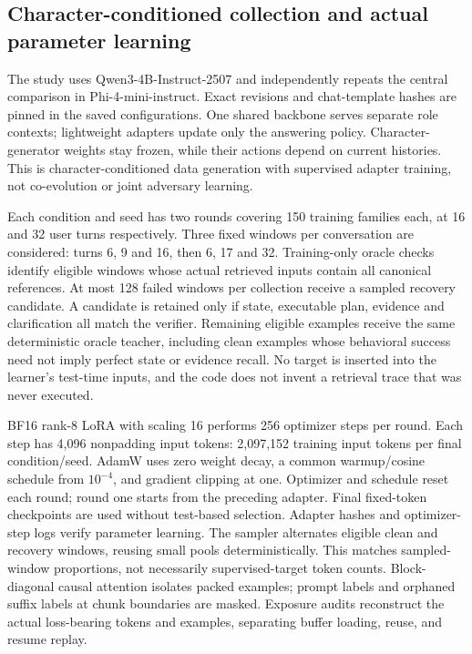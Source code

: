 \documentclass{svproc}
\begin{document}
\subsection{Character-conditioned collection and actual parameter learning}
The study uses Qwen3-4B-Instruct-2507 and independently repeats the central
comparison in Phi-4-mini-instruct. Exact revisions and chat-template hashes are
pinned in the saved configurations. One shared backbone serves separate role
contexts; lightweight adapters update only the answering policy. Character-generator
weights stay frozen, while their actions depend on current histories. This is
character-conditioned data generation with supervised adapter training, not
co-evolution or joint adversary learning.

Each condition and seed has two rounds covering 150 training families each, at
16 and 32 user turns respectively. Three fixed windows per conversation are
considered: turns 6, 9 and 16, then 6, 17 and 32. Training-only oracle checks
identify eligible windows whose actual retrieved inputs contain all canonical
references. At most 128 failed windows per collection receive a sampled recovery
candidate. A candidate is retained only if state, executable plan, evidence and
clarification all match the verifier. Remaining eligible examples receive the
same deterministic oracle teacher, including clean examples whose behavioral
success need not imply perfect state or evidence recall. No target is inserted
into the learner's test-time inputs, and the code does not invent a retrieval
trace that was never executed.

BF16 rank-8 LoRA with scaling 16 performs 256 optimizer steps per round. Each
step has 4,096 nonpadding input tokens: 2,097,152 training input tokens per final
condition/seed. AdamW uses zero weight decay, a common warmup/cosine schedule from
$10^{-4}$, and gradient clipping at one. Optimizer and schedule reset each round;
round one starts from the preceding adapter. Final fixed-token checkpoints are
used without test-based selection. Adapter hashes and optimizer-step logs verify
parameter learning. The sampler alternates eligible clean and recovery windows,
reusing small pools deterministically. This matches sampled-window proportions,
not necessarily supervised-target token counts. Block-diagonal causal attention
isolates packed examples; prompt labels and orphaned suffix labels at chunk
boundaries are masked. Exposure audits reconstruct the actual loss-bearing tokens
and examples, separating buffer loading, reuse, and resume replay.
\end{document}

